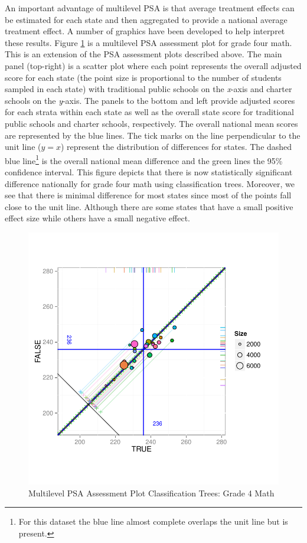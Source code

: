 \documentclass[letterpaper,12p,twoside]{article} %
\begin{document}
An important advantage of multilevel PSA is that average treatment effects can be estimated for each state and then aggregated to provide a national average treatment effect. A number of graphics have been developed to help interpret these results. Figure \ref{fig:g4math-mlpsa-ctree} is a multilevel PSA assessment plot for grade four math. This is an extension of the PSA assessment plots described above. The main panel (top-right) is a scatter plot where each point represents the overall adjusted score for each state (the point size is proportional to the number of students sampled in each state) with traditional public schools on the \textit{x}-axis and charter schools on the \textit{y}-axis. The panels to the bottom and left provide adjusted scores for each strata within each state as well as the overall state score for traditional public schools and charter schools, respectively. The overall national mean scores are represented by the blue lines. The tick marks on the line perpendicular to the unit line ($y = x$) represent the distribution of differences for states. The dashed blue line\footnote{For this dataset the blue line almost complete overlaps the unit line but is present.} is the overall national mean difference and the green lines the 95\% confidence interval. This figure depicts that there is now statistically significant difference nationally for grade four math using classification trees. Moreover, we see that there is minimal difference for most states since most of the points fall close to the unit line. Although there are some states that have a small positive effect size while others have a small negative effect. 

\begin{figure}[h]
\begin{center}
\includegraphics[width=\textwidth]{../Figures2009/g4math-mlpsa-ctree-circ.pdf}
\caption{Multilevel PSA Assessment Plot Classification Trees: Grade 4 Math}
\label{fig:g4math-mlpsa-ctree}
\end{center}
\end{figure}
\end{document}
